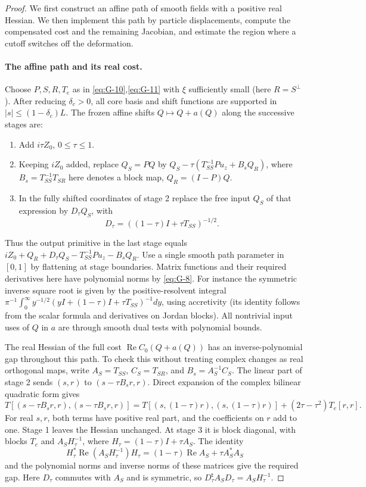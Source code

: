 \begin{proof}
We first construct an affine path of smooth fields with a positive real
Hessian. We then implement this path by particle displacements, compute
the compensated cost and the remaining Jacobian, and estimate the region
where a cutoff switches off the deformation.

\paragraph{The affine path and its real cost.}
Choose \(P,S,R,T_e\) as in \eqref{eq:G-10},\eqref{eq:G-11} with \(\xi\) sufficiently small (here \(R=S^\perp\)). After reducing \(\delta_c>0\), all core basis and shift functions are supported in \(|s|\le(1-\delta_c)L\). The frozen affine shifts \(Q\mapsto Q+a(Q)\) along the successive stages are:
\begin{enumerate}
\item Add \(i\tau Z_0\), \(0\le\tau\le1\).
\item Keeping \(i Z_0\) added, replace \(Q_S=P Q\) by \(Q_S-\tau(T_{SS}^{-1}P u_z+B_s Q_R)\), where \(B_s=T_{SS}^{-1}T_{SR}\) here denotes a block map, \(Q_R=(I-P)Q\).
\item In the fully shifted coordinates of stage 2 replace the free input \(Q_S\) of that expression by \(D_\tau Q_S\), with
\[
 D_\tau=((1-\tau)I+\tau T_{SS})^{-1/2}.
\]
\end{enumerate}
Thus the output primitive in the last stage equals \(i Z_0+Q_R+D_\tau Q_S-T_{SS}^{-1}P u_z-B_s Q_R\).
Use a single smooth path parameter in \([0,1]\) by flattening at stage boundaries. Matrix functions and their required derivatives here have polynomial norms by \eqref{eq:G-8}. For instance the symmetric inverse square root is given by the positive-resolvent integral \(\pi^{-1}\int_0^\infty y^{-1/2}(yI+(1-\tau)I+\tau T_{SS})^{-1}dy\), using accretivity (its identity follows from the scalar formula and derivatives on Jordan blocks). All nontrivial input uses of \(Q\) in \(a\) are through smooth dual tests with polynomial bounds.

The real Hessian of the full cost \(\operatorname{Re}C_0(Q+a(Q))\)
has an inverse-polynomial gap throughout this path. To check this
without treating complex changes as real orthogonal maps, write
\(A_S=T_{SS}\), \(C_S=T_{SR}\), and \(B_s=A_S^{-1}C_S\).
The linear part of stage 2 sends \((s,r)\) to \((s-\tau B_sr,r)\).
Direct expansion of the complex bilinear quadratic form gives
\[
 T[(s-\tau B_sr,r),(s-\tau B_sr,r)]
 =T[(s,(1-\tau)r),(s,(1-\tau)r)]
       +(2\tau-\tau^2)T_e[r,r].
\]
For real \(s,r\), both terms have positive real part, and the
coefficients on \(r\) add to one. Stage 1 leaves the Hessian unchanged.
At stage 3 it is block diagonal, with blocks \(T_e\) and
\(A_SH_\tau^{-1}\), where \(H_\tau=(1-\tau)I+\tau A_S\).
The identity
\[
 H_\tau^*\operatorname{Re}(A_SH_\tau^{-1})H_\tau
       =(1-\tau)\operatorname{Re}A_S+\tau A_S^*A_S
\]
and the polynomial norms and inverse norms of these matrices give the
required gap. Here \(D_\tau\) commutes with \(A_S\) and is symmetric,
so \(D_\tau^{\mathsf t}A_SD_\tau=A_SH_\tau^{-1}\).


\end{proof}
